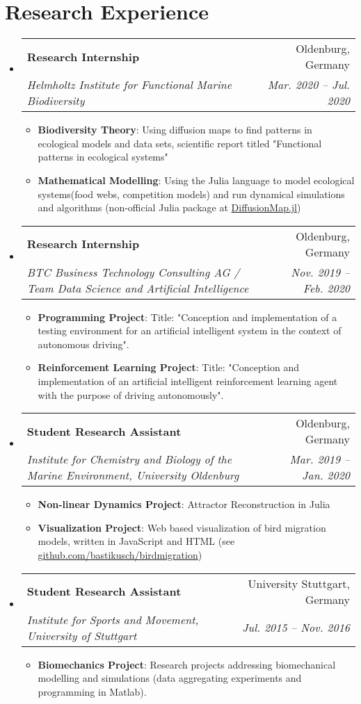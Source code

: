 \documentclass[letterpaper,11pt]{article}
\makeatletter
\newcommand{\resumeItem}[2]{
  \item\small{ \textbf{#1}{: #2 \vspace{-2pt}} } }
\newcommand{\resumeSubheading}[4]{ \vspace{-1pt}\item
    \begin{tabular*}{0.97\textwidth}{l@{\extracolsep{\fill}}r} \textbf{#1} & #2
      \\
      \textit{\small#3} & \textit{\small #4} \\
    \end{tabular*}\vspace{-5pt} }
\newcommand{\resumeSubHeadingListStart}{\begin{itemize}[leftmargin=*]}
\newcommand{\resumeSubHeadingListEnd}{\end{itemize}}
\newcommand{\resumeItemListStart}{\begin{itemize}}
\newcommand{\resumeItemListEnd}{\end{itemize}\vspace{-5pt}}
\makeatother
\begin{document}
\section{Research Experience}
  \resumeSubHeadingListStart

    \resumeSubheading {Research Internship}{Oldenburg, Germany} {Helmholtz
    Institute for Functional Marine Biodiversity}{Mar. 2020 -- Jul. 2020}
    \resumeItemListStart \resumeItem{Biodiversity Theory} {Using diffusion maps
    to find patterns in ecological models and data sets, scientific report
    titled "Functional patterns in ecological systems"} \resumeItem{Mathematical
    Modelling} {Using the Julia language to model ecological systems(food webs,
    competition models) and run dynamical simulations and algorithms
    (non-official Julia package at
    \href{https://github.com/bastikusch/DiffusionMap.jl}{DiffusionMap.jl})}
    \resumeItemListEnd

    \resumeSubheading {Research Internship}{Oldenburg, Germany} {BTC Business
    Technology Consulting AG / Team Data Science and Artificial
    Intelligence}{Nov. 2019 -- Feb. 2020} \resumeItemListStart
    \resumeItem{Programming Project} {Title: "Conception and implementation
    of a testing environment for an artificial intelligent system in the
    context of autonomous driving".} \resumeItem{Reinforcement Learning Project}
    {Title: "Conception and implementation of an
    artificial intelligent reinforcement learning agent with the purpose of
    driving autonomously".} \resumeItemListEnd

    \resumeSubheading {Student Research Assistant}{Oldenburg, Germany}
    {Institute for Chemistry and Biology of the Marine Environment, University
    Oldenburg}{Mar. 2019 -- Jan. 2020} \resumeItemListStart
    \resumeItem{Non-linear Dynamics Project}{ Attractor Reconstruction in Julia}
    \resumeItem{Visualization Project} {Web based visualization of bird migration
    models, written in JavaScript and HTML (see \href{https://github.com/bastikusch/birdmigration}{github.com/bastikusch/birdmigration})} \resumeItemListEnd

    \resumeSubheading {Student Research Assistant}{University Stuttgart,
    Germany} {Institute for Sports and Movement, University of Stuttgart}{Jul.
    2015 -- Nov. 2016} \resumeItemListStart \resumeItem{Biomechanics Project}{Research
    projects addressing biomechanical modelling and simulations (data
    aggregating experiments and programming in Matlab).} \resumeItemListEnd
    \resumeSubHeadingListEnd
\end{document}
